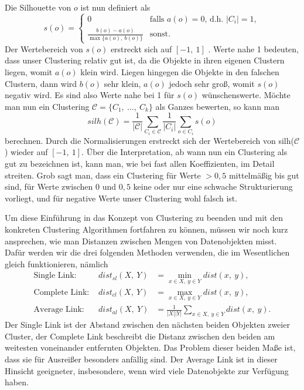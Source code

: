 Die Silhouette von \(o\) ist nun
definiert als
\[ s(o) = \begin{cases}
		0 & \text{falls } a(o)=0\text{, d.h. } \lvert C_i \rvert = 1,\\
		\frac{b(o)-a(o)}{\max\{a(o),\ b(o)\}} & \text{sonst.}
		\end{cases}\]
Der Wertebereich von \(s(o)\) erstreckt sich auf \([-1,\ 1]\) .
Werte nahe 1 bedeuten, dass unser Clustering relativ gut ist,
da die Objekte in ihren eigenen Clustern liegen, womit \(a(o)\)
klein wird. Liegen hingegen die Objekte in den falschen Clustern, 
dann wird \(b(o)\) sehr klein, \(a(o)\) jedoch sehr groß, womit
\(s(o)\) negativ wird. Es sind also Werte nahe bei 1 für \(s(o)\)
wünschenswerte. Möchte man nun ein Clustering \(\mathcal{C}=
\{C_1,\ \dots ,\ C_k\}\) als Ganzes bewerten, so kann man
\[ silh(\mathcal{C}) = \frac{1}{\lvert \mathcal{C}\rvert}
\sum_{C_i \in \mathcal{C}}\frac{1}{\lvert C_i\rvert}
\sum_{o\in C_i} s(o)\]
berechnen. Durch die Normalisierungen erstreckt sich der
Wertebereich von silh(\(\mathcal{C}\)) wieder auf  \([-1,\ 1]\).
Über die Interpretation, ab wann nun ein Clustering als gut
zu bezeichnen ist, kann man, wie bei fast allen Koeffizienten,
im Detail streiten. Grob sagt man, dass ein Clustering für 
Werte \(> 0,5\) mittelmäßig bis gut sind, für Werte zwischen
\(0\) und \(0,5\) keine oder nur eine schwache Strukturierung 
vorliegt, und für negative Werte unser Clustering wohl falsch ist.

Um diese Einführung in das Konzept von Clustering zu beenden 
und mit den konkreten Clustering Algorithmen fortfahren zu können,
müssen wir noch kurz ansprechen, wie man Distanzen zwischen
Mengen von Datenobjekten misst. Dafür werden wir die drei folgenden
Methoden verwenden, die im Wesentlichen gleich funktionieren,
nämlich
\begin{align*}
\text{Single Link: }& dist_{sl}(X,\ Y) &= \min_{x\in X,\ y\in Y} 
dist(x,\ y),\\
\text{Complete Link: }& dist_{cl}(X,\ Y) &= \max_{x\in X,\ y\in Y} 
dist(x,\ y),\\
\text{Average Link: }& dist_{al}(X,\ Y) &= 
\frac{1}{\lvert X\rvert \lvert Y\rvert}\sum_{x\in X,\ y\in Y} 
dist(x,\ y).
\end{align*}
Der Single Link ist der Abstand zwischen den nächsten beiden Objekten
zweier Cluster, der Complete Link beschreibt die Distanz zwischen den
beiden am weitesten voneinander entfernten Objekten. Das Problem
dieser beiden Maße ist, dass sie für Ausreißer besonders anfällig sind.
Der Average Link ist in dieser Hinsicht geeigneter, insbesondere, wenn
wird viele Datenobjekte zur Verfügung haben.


